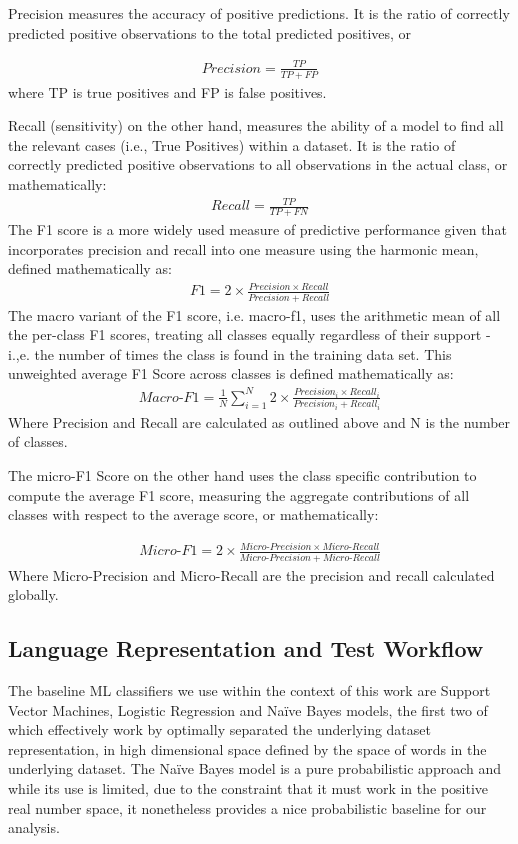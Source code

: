 \documentclass[final]{clv2025}
\begin{document}
Precision measures the accuracy of positive predictions. It is the ratio of correctly predicted positive observations to the total predicted positives, or 

\begin{align*}
    Precision=\frac{TP}{TP+FP}
\end{align*}
where TP is true positives and FP is false positives. 

Recall (sensitivity) on the other hand, measures the ability of a model to find all the relevant cases (i.e., True Positives) within a dataset. It is the ratio of correctly predicted positive observations to all observations in the actual class, or mathematically:
\begin{align*}
    Recall=\frac{TP}{TP+FN}
\end{align*}
The F1 score is a more widely used measure of predictive performance given that incorporates precision and recall into one measure using the harmonic mean, defined mathematically as: 
\begin{align*}
  F1=2\times \frac{Precision\times Recall}{Precision+Recall}  
\end{align*}
The macro variant of the F1 score, i.e. macro-f1, uses the arithmetic mean of all the per-class F1 scores, treating all classes equally regardless of their support - i.,e. the number of times the class is found in the training data set. This unweighted average F1 Score across classes is defined mathematically as:
\begin{align*}
    Macro\text{-}F1=\frac{1}{N }\sum_{i=1}^{N} 2\times \frac{Precision_i\times Recall_i}{Precision_i+Recall_i} 
\end{align*}
Where Precision and Recall are calculated as outlined above and N is the number of classes.

The micro-F1 Score on the other hand uses the class specific contribution to compute the average F1 score, measuring the aggregate contributions of all classes with respect to the average score, or mathematically:

\begin{align*}
    Micro\text{-}F1=2\times \frac{Micro \text{-}Precision\times Micro\text{-}Recall}{Micro\text{-}Precision+Micro\text{-}Recall}
\end{align*}
Where Micro-Precision and Micro-Recall are the precision and recall calculated globally.
\subsection{Language Representation and Test Workflow}
The baseline ML classifiers we use within the context of this work are Support Vector Machines, Logistic Regression and Naïve Bayes models, the first two of which effectively work by optimally separated the underlying dataset representation, in high dimensional space defined by the space of words in the underlying dataset. The Naïve Bayes model is a pure probabilistic approach and while its use is limited, due to the constraint that it must work in the positive real number space, it nonetheless provides a nice probabilistic baseline for our analysis. 
\end{document}
